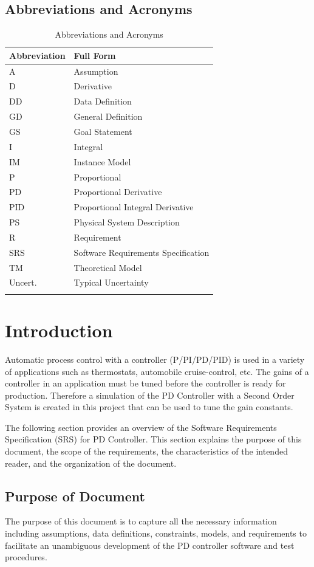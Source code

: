 \documentclass[12pt]{article}
\begin{document}
\subsection{Abbreviations and Acronyms}
\label{Sec:TAbbAcc}
\begin{longtable}{l l}
\toprule
\textbf{Abbreviation} & \textbf{Full Form}
\\
\midrule
\endhead
A & Assumption
\\
D & Derivative
\\
DD & Data Definition
\\
GD & General Definition
\\
GS & Goal Statement
\\
I & Integral
\\
IM & Instance Model
\\
P & Proportional
\\
PD & Proportional Derivative
\\
PID & Proportional Integral Derivative
\\
PS & Physical System Description
\\
R & Requirement
\\
SRS & Software Requirements Specification
\\
TM & Theoretical Model
\\
Uncert. & Typical Uncertainty
\\
\bottomrule
\caption{Abbreviations and Acronyms}
\label{Table:TAbbAcc}
\end{longtable}
\section{Introduction}
\label{Sec:Intro}
Automatic process control with a controller (P/PI/PD/PID) is used in a variety of applications such as thermostats, automobile cruise-control, etc. The gains of a controller in an application must be tuned before the controller is ready for production. Therefore a simulation of the PD Controller with a Second Order System is created in this project that can be used to tune the gain constants.

The following section provides an overview of the Software Requirements Specification (SRS) for PD Controller. This section explains the purpose of this document, the scope of the requirements, the characteristics of the intended reader, and the organization of the document.

\subsection{Purpose of Document}
\label{Sec:DocPurpose}
The purpose of this document is to capture all the necessary information including assumptions, data definitions, constraints, models, and requirements to facilitate an unambiguous development of the PD controller software and test procedures.
\end{document}
